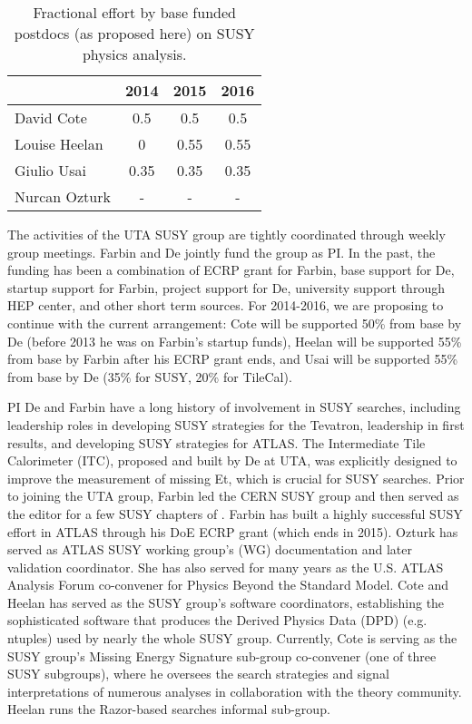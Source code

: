 \begin{table}[htb]
\centering
\begin{tabular}{ | l | c | c | c | }
\hline \hline
 & 2014 & 2015 & 2016 \\ \hline
David Cote & 0.5 & 0.5 & 0.5 \\ \hline
Louise Heelan & 0 & 0.55 & 0.55 \\ \hline
Giulio Usai & 0.35 & 0.35 & 0.35 \\ \hline
Nurcan Ozturk & - & - & - \\ \hline \hline
\end{tabular}
\caption{Fractional effort by base funded postdocs (as proposed here) on SUSY physics analysis.}
\label{table:susy-effort}
\end{table}

The activities of the UTA SUSY group are tightly coordinated through weekly group meetings. Farbin and De jointly fund the group as PI. In the past, the funding has been a combination of ECRP grant for Farbin, base support for De, startup support for Farbin, project support for De, university support through HEP center, and other short term sources. For 2014-2016, we are proposing to continue with the current arrangement: Cote will be supported 50\% from base by De (before 2013 he was on Farbin's startup funds), Heelan will be supported 55\% from base by Farbin after his ECRP grant ends, and Usai will be supported 55\% from base by De (35\% for SUSY, 20\% for TileCal).

PI De and Farbin have a long history of involvement in SUSY searches,
including leadership roles in developing SUSY strategies for the
Tevatron, leadership in first  results, and developing SUSY
strategies for ATLAS. The Intermediate Tile Calorimeter (ITC),
proposed and built by De at UTA, was explicitly designed to improve
the measurement of missing Et, which is crucial for SUSY
searches. Prior to joining the UTA group, Farbin led the CERN SUSY
group and then served as the editor for a few SUSY chapters of
\cite{CSCBook}. Farbin has built a highly successful SUSY effort in
ATLAS through his DoE ECRP grant (which ends in 2015). Ozturk has
served as ATLAS SUSY working group's (WG) documentation and later
validation coordinator. She has also served for many years as the
U.S. ATLAS Analysis Forum co-convener for Physics Beyond the Standard
Model. Cote and Heelan has served as the SUSY group's software
coordinators, establishing the sophisticated software that produces
the Derived Physics Data (DPD) (e.g. ntuples) used by nearly the whole
SUSY group. Currently, Cote is serving as the SUSY group's Missing
Energy Signature sub-group co-convener (one of three SUSY subgroups),
where he oversees the search strategies and signal interpretations of
numerous analyses in collaboration with the theory community. Heelan
runs the Razor-based searches informal sub-group.

